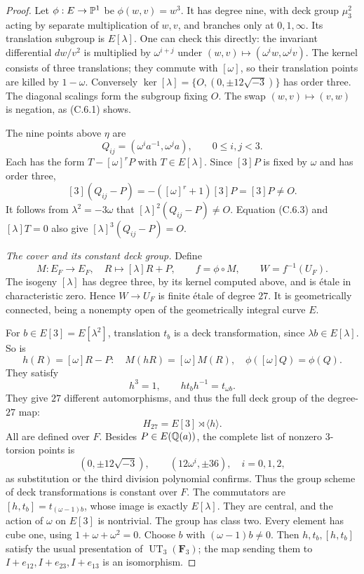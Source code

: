 \begin{proof}
Let $\phi:E\to\mathbb P^1$ be $\phi(w,v)=w^3$. It has degree nine,
with deck group $\mu_3^2$ acting by separate multiplication of
$w,v$, and branches only at $0,1,\infty$. Its translation subgroup
is $E[\lambda]$. One can check this directly: the invariant
differential $dw/v^2$ is multiplied by $\omega^{i+j}$ under
$(w,v)\mapsto(\omega^i w,\omega^j v)$. The kernel consists of
three translations; they commute with $[\omega]$, so their
translation points are killed by $1-\omega$. Conversely
$\ker[\lambda]=\{O,(0,\pm12\sqrt{-3})\}$ has order three.
The diagonal scalings form the subgroup fixing $O$.
The swap $(w,v)\mapsto(v,w)$ is negation, as (C.6.1) shows.

The nine points above $\eta$ are
\[
 Q_{ij}=(\omega^i a^{-1},\omega^j a),\qquad 0\le i,j<3.
\]
Each has the form $T-[\omega]^rP$ with $T\in E[\lambda]$.
Since $[3]P$ is fixed by $\omega$ and has order three,
\[
 [3](Q_{ij}-P)=-([\omega]^r+1)[3]P=[3]P\ne O.
 \tag{C.6.4}
\]
It follows from $\lambda^2=-3\omega$ that
$[\lambda]^2(Q_{ij}-P)\ne O$. Equation (C.6.3) and
$[\lambda]T=0$ also give $[\lambda]^3(Q_{ij}-P)=O$.

\emph{The cover and its constant deck group.}
Define
\[
 M:E_F\longrightarrow E_F,\quad R\longmapsto[\lambda]R+P,
 \qquad f=\phi\circ M,
 \qquad W=f^{-1}(U_F).
 \tag{C.6.5}
\]
The isogeny $[\lambda]$ has degree three, by its kernel computed
above, and is \'etale in characteristic zero. Hence $W\to U_F$
is finite \'etale of degree $27$. It is geometrically connected,
being a nonempty open of the geometrically integral curve $E$.

For $b\in E[3]=E[\lambda^2]$, translation $t_b$ is a deck
transformation, since $\lambda b\in E[\lambda]$. So is
\[
 h(R)=[\omega]R-P:
 \quad M(hR)=[\omega]M(R),\quad \phi([\omega]Q)=\phi(Q).
\]
They satisfy
\[
 h^3=1,\qquad h t_bh^{-1}=t_{\omega b}.
\]
They give $27$ different automorphisms, and thus the full deck
group of the degree-$27$ map:
\[
 H_{27}=E[3]\rtimes\langle h\rangle.
\]
All are defined over $F$. Besides $P\in E(\mathbb Q(a))$, the complete
list of nonzero $3$-torsion points is
\[
 (0,\pm12\sqrt{-3}),\qquad (12\omega^i,\pm36),\quad i=0,1,2,
\]
as substitution or the third division polynomial confirms.
Thus the group scheme of deck transformations is constant over $F$.
The commutators are
$[h,t_b]=t_{(\omega-1)b}$, whose image is exactly $E[\lambda]$.
They are central, and the action of $\omega$ on $E[3]$ is
nontrivial. The group has class two. Every element has cube one,
using $1+\omega+\omega^2=0$. Choose $b$ with
$(\omega-1)b\ne0$. Then $h,t_b,[h,t_b]$ satisfy the usual
presentation of $\operatorname{UT}_3(\mathbf F_3)$; the map sending
them to $I+e_{12},I+e_{23},I+e_{13}$ is an isomorphism.


\end{proof}
